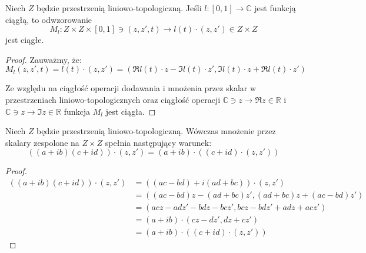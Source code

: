 \begin{lem} \label{lem:mult-cont}
  Niech $Z$ będzie przestrzenią liniowo-topologiczną.
  Jeśli $l: [0,1] \rightarrow \mathbb{C}$ jest funkcją ciągłą, to odwzorowanie
  \[M_l: Z \times Z \times [0,1] \ni (z, z', t) \rightarrow l(t) \cdot (z, z') \in Z \times Z\]
  jest ciągłe.
  
  \begin{proof}
  Zauważmy, że:
  \[M_l(z, z', t) = l(t) \cdot(z, z') = (\Re{l(t)} \cdot z - \Im{l(t)} \cdot z', \Im{l(t)} \cdot z + \Re{l(t)} \cdot z')\]
  
  Ze względu na ciągłość operacji dodawania i mnożenia przez skalar w przestrzeniach liniowo-topologicznych oraz ciągłość operacji $\mathbb{C} \ni z \rightarrow \Re z \in \mathbb{R}$ i $\mathbb{C} \ni z \rightarrow \Im z \in \mathbb{R}$ funkcja $M_l$ jest ciągła.
  \end{proof}
\end{lem}

\begin{lem} \label{lem:mult-eq}
  Niech $Z$ będzie przestrzenią liniowo-topologiczną. Wówczas mnożenie przez skalary zespolone na $Z \times Z$ spełnia następujący warunek:
  \[((a + ib)(c + id)) \cdot (z, z') = (a + ib) \cdot ((c+id) \cdot (z, z'))\]
  
  \begin{proof}
    \begin{align*}
      ((a+ib)(c+id)) \cdot (z, z') &= ((ac - bd) + i(ad+bc)) \cdot (z, z') \\
      &= ((ac-bd)z - (ad+bc) z', (ad+bc)z + (ac-bd)z') \\
      &= (acz-adz' - bdz-bcz', bcz-bdz' + adz+acz') \\
      &= (a+ib) \cdot (cz -dz', dz + cz') \\
      &= (a+ib) \cdot ((c+id) \cdot (z,z'))
    \end{align*}

  \end{proof}
\end{lem}

